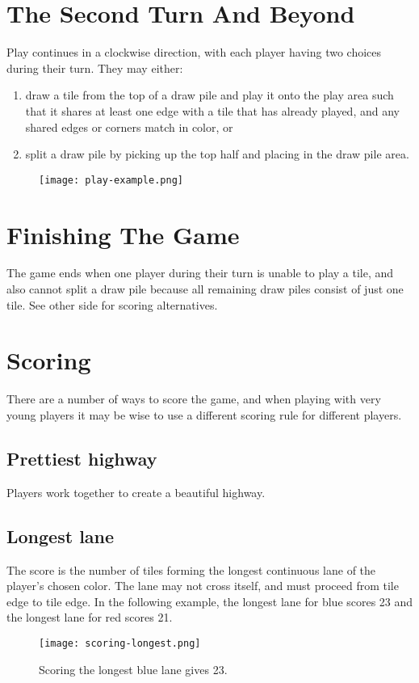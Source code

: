 \documentclass[twocolumn, 11pt]{article}
\begin{document}
\section*{The Second Turn And Beyond}
Play continues in a clockwise direction, with each player having two
choices during their turn.  They may either:
\begin{enumerate}
\item draw a tile from the top of a draw pile and play it onto the
  play area such that it shares at least one edge with a tile that has
  already played, and any shared edges or corners match in color,
  or
\item split a draw pile by picking up the top half and placing
  in the draw pile area.
\end{enumerate}
\begin{figure}[th]
  \texttt{[image: play-example.png]}
\end{figure}

\section*{Finishing The Game}
The game ends when one player during their turn is unable to play a
tile, and also cannot split a draw pile because all remaining draw
piles consist of just one tile.  See other side for scoring
alternatives.

\section*{Scoring}
There are a number of ways to score the game, and when playing with
very young players it may be wise to use a different scoring rule for
different players.
\subsection*{Prettiest highway}
Players work together to create a beautiful highway.
\subsection*{Longest lane}
The score is the number of tiles forming the longest continuous lane
of the player’s chosen color. The lane may not cross itself, and must
proceed from tile edge to tile edge.  In the following example, the
longest lane for blue scores 23 and the longest lane for red scores
21.

\begin{figure}[h]
  \texttt{[image: scoring-longest.png]}
  \caption{Scoring the longest blue lane gives 23.}
\end{figure}
\end{document}
